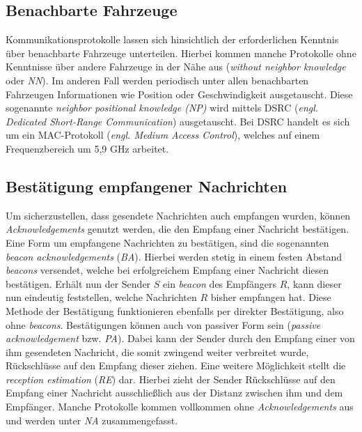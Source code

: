 \documentclass[english,runningheads,a4paper]{llncs}[2018/03/10]
\begin{document}
\subsection{Benachbarte Fahrzeuge}\label{subsec:benachbarte-fahrzeuge}
Kommunikationsprotokolle lassen sich hinsichtlich der erforderlichen Kenntnis über benachbarte Fahrzeuge unterteilen.
Hierbei kommen manche Protokolle ohne Kenntnisse über andere Fahrzeuge in der Nähe aus (\textit{without neighbor knowledge} oder \textit{NN}).
Im anderen Fall werden periodisch unter allen benachbarten Fahrzeugen Informationen wie Position oder Geschwindigkeit ausgetauscht.
Diese sogenannte \textit{neighbor positional knowledge (NP)} wird mittels DSRC (\textit{engl. Dedicated Short-Range Communication}) ausgetauscht.
Bei DSRC handelt es sich um ein MAC-Protokoll (\textit{engl. Medium Access Control}), welches auf einem Frequenzbereich um 5,9 GHz arbeitet\cite{conti2013mobile}.

\subsection{Bestätigung empfangener Nachrichten}
Um sicherzustellen, dass gesendete Nachrichten auch empfangen wurden, können \textit{Acknowledgements} genutzt werden, die den Empfang einer Nachricht bestätigen.
Eine Form um empfangene Nachrichten zu bestätigen, sind die sogenannten \textit{beacon acknowledgements} (\textit{BA}).
Hierbei werden stetig in einem festen Abstand \textit{beacons} versendet, welche bei erfolgreichem Empfang einer Nachricht diesen bestätigen.
Erhält nun der Sender $S$ ein \textit{beacon} des Empfängers $R$, kann dieser nun eindeutig feststellen, welche Nachrichten $R$ bisher empfangen hat.
Diese Methode der Bestätigung funktionieren ebenfalls per direkter Bestätigung, also ohne \textit{beacons}.
Bestätigungen können auch von passiver Form sein (\textit{passive acknowledgement} bzw. \textit{PA}).
Dabei kann der Sender durch den Empfang einer von ihm gesendeten Nachricht, die somit zwingend weiter verbreitet wurde, Rückschlüsse auf den Empfang dieser ziehen.
Eine weitere Möglichkeit stellt die \textit{reception estimation} (\textit{RE}) dar.
Hierbei zieht der Sender Rückschlüsse auf den Empfang einer Nachricht ausschließlich aus der Distanz zwischen ihm und dem Empfänger.
Manche Protokolle kommen vollkommen ohne \textit{Acknowledgements} aus und werden unter \textit{NA} zusammengefasst\cite{conti2013mobile}.
\end{document}
